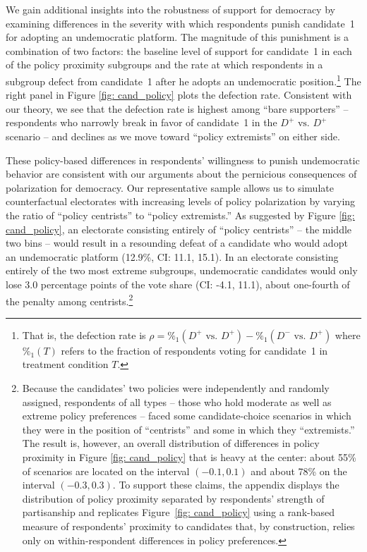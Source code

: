 \documentclass[letterpaper, 12pt]{article}
\begin{document}
\begin{raggedright}
We gain additional insights into the robustness of support for democracy by examining differences in the severity with which respondents punish candidate~1 for adopting an undemocratic platform. The magnitude of this punishment is a combination of two factors: the baseline level of support for candidate~1 in each of the policy proximity subgroups and the rate at which respondents in a subgroup defect from candidate~1 after he adopts an undemocratic position.\footnote{That is, the defection rate is $\rho = \%_{1}(D^+ \text{ vs. } D^+) - \%_{1}(D^- \text{ vs. } D^+)$ where $\%_{1}(T)$ refers to the fraction of respondents voting for candidate~1 in treatment condition $T$.} The right panel in Figure \ref{fig: cand_policy} plots the defection rate. Consistent with our theory, we see that the defection rate is highest among ``bare supporters'' -- respondents who narrowly break in favor of candidate~1 in the $D^+ \text{ vs. } D^+$ scenario -- and declines as we move toward ``policy extremists'' on either side.

These policy-based differences in respondents' willingness to punish undemocratic behavior are consistent with our arguments about the pernicious consequences of polarization for democracy. Our representative sample allows us to simulate counterfactual electorates with increasing levels of policy polarization by varying the ratio of ``policy centrists'' to ``policy extremists.'' As suggested by Figure \ref{fig: cand_policy}, an electorate consisting entirely of ``policy centrists'' -- the middle two bins -- would result in a resounding defeat of a candidate who would adopt an undemocratic platform (12.9\%, CI: 11.1, 15.1). In an electorate consisting entirely of the two most extreme subgroups, undemocratic candidates would only lose 3.0 percentage points of the vote share (CI: -4.1, 11.1), about one-fourth of the penalty among centrists.\footnote{Because the candidates' two policies were independently and randomly assigned, respondents of all types -- those who hold moderate as well as extreme policy preferences -- faced some candidate-choice scenarios in which they were in the position of ``centrists'' and some in which they ``extremists.'' The result is, however, an overall distribution of differences in policy proximity in Figure \ref{fig: cand_policy} that is heavy at the center: about 55\% of scenarios are located on the interval $(-0.1, 0.1)$ and about 78\% on the interval $(-0.3, 0.3)$. To support these claims, the appendix displays the distribution of policy proximity separated by respondents' strength of partisanship and replicates Figure~\ref{fig: cand_policy} using a rank-based measure of respondents' proximity to candidates that, by construction, relies only on within-respondent differences in policy preferences.}



\end{raggedright}
\end{document}
